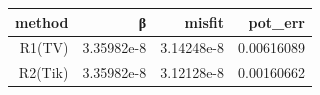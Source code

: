 \begin{tabular}{rrrr}
  \toprule
  \textbf{method} & \textbf{β} & \textbf{misfit} & \textbf{pot\_err} \\
  \midrule
  R1(TV) & 3.35982e-8 & 3.14248e-8 & 0.00616089 \\
  R2(Tik) & 3.35982e-8 & 3.12128e-8 & 0.00160662 \\
  \bottomrule
\end{tabular}
